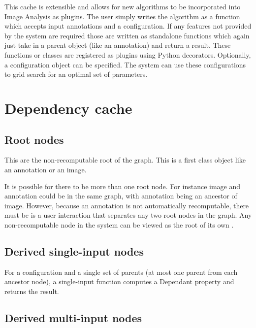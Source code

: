     This cache is extensible and allows for new algorithms to be
      incorporated into Image Analysis as plugins.
    The user simply writes the algorithm as a function which accepts
      input annotations and a configuration.
    If any features not provided by the system are required those are
      written as standalone functions which again just take in a parent
      object (like an annotation) and return a result.
    These functions or classes are registered as plugins using Python
      decorators.
    Optionally, a configuration object can be specified.
    The system can use these configurations to grid search for an
      optimal set of parameters.

    \section{Dependency cache}\label{sec:depc}

        \subsection{Root nodes}

            This are the non-recomputable root of the graph.
            This is a first class object like an annotation or an
              image.

            It is possible for there to be more than one root node.
            For instance image and annotation could be in the same
              graph, with annotation being an ancestor of image.
            However, because an annotation is not automatically
              recomputable, there must be is a user interaction that
              separates any two root nodes in the graph.
            Any non-recomputable node in the system can be viewed as
              the root of its own \DependencyCache{}.

        \subsection{Derived single-input nodes}

            For a configuration and a single set of parents (at most
              one parent from each ancestor node), a single-input
              function computes a Dependant property and returns the
              result.

        \subsection{Derived multi-input nodes}

